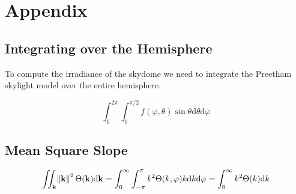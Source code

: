 \chapter{Appendix}
\section{Integrating over the Hemisphere}
To compute the irradiance of the skydome we need to integrate the Preetham skylight
model over the entire hemisphere.

%

\begin{equation}
\int_{0}^{2\pi}\int_{0}^{\pi/2} f(\varphi,\theta) \sin{\theta}\mathrm{d}\theta\mathrm{d}\varphi
\end{equation}
\section{Mean Square Slope}
\begin{equation}
\iint_{\mathbf{k}} \norm{\mathbf{k}}^2 \Theta(\mathbf{k}) \mathrm{d}\mathbf{k} = \int_{0}^{\infty} \int_{-\pi}^{\pi} k^2 \Theta(k,\varphi) k \mathrm{d}k\mathrm{d}\varphi =  \int_{0}^{\infty}k^2 \Theta(k)\mathrm{d}k
\end{equation}